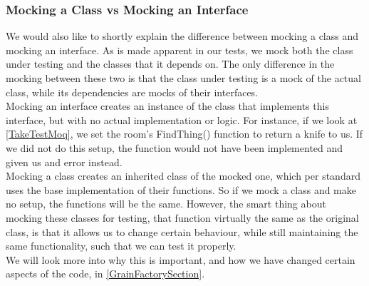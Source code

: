 \subsubsection{Mocking a Class vs Mocking an Interface} \label{MockingVsSection}
We would also like to shortly explain the difference between mocking a class and mocking an interface. As is made apparent in our tests, we mock both the class under testing and the classes that it depends on. The only difference in the mocking between these two is that the class under testing is a mock of the actual class, while its dependencies are mocks of their interfaces. \\
Mocking an interface creates an instance of the class that implements this interface, but with no actual implementation or logic. For instance, if we look at \autoref{TakeTestMoq}, we set the room's FindThing() function to return a knife to us. If we did not do this setup, the function would not have been implemented and given us and error instead.  \\
Mocking a class creates an inherited class of the mocked one, which per standard uses the base implementation of their functions. So if we mock a class and make no setup, the functions will be the same. However, the smart thing about mocking these classes for testing, that function virtually the same as the original class, is that it allows us to change certain behaviour, while still maintaining the same functionality, such that we can test it properly.  \\
We will look more into why this is important, and how we have changed certain aspects of the code, in \autoref{GrainFactorySection}. 

